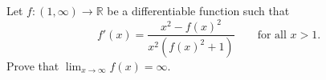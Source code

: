 Let $f: (1, \infty) \to \mathbb{R}$ be a differentiable function such that
\[
 f'(x) = \frac{x^2 - f(x)^2}{x^2 (f(x)^2 + 1)}
\qquad \mbox{for all $x>1$.}
\]
Prove that $\lim_{x \to \infty} f(x) = \infty$.
